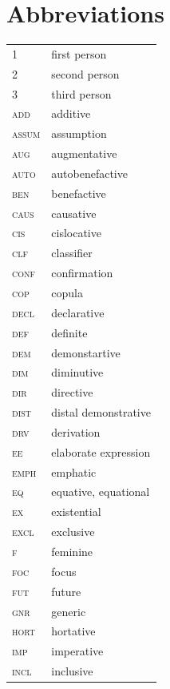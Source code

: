 \documentclass[output=paper,colorlinks,citecolor=brown]{langscibook}
\begin{document}
\section*{Abbreviations}
\begin{tabularx}{.45\textwidth}{lQ}
1 & first person \\
2 & second person \\
3 & third person \\
\scshape add & additive \\
\scshape assum & assumption \\
\scshape aug & augmentative \\
\scshape auto & autobenefactive \\
\scshape ben & benefactive \\
\scshape caus & causative \\
\scshape cis & cislocative \\
\scshape clf & classifier \\
\scshape conf & confirmation \\
\scshape cop & copula \\
\scshape decl & declarative \\
\scshape def & definite \\
\scshape dem & demonstartive \\
\scshape dim & diminutive \\
\scshape dir & directive \\
\scshape dist & distal demonstrative \\
\scshape drv & derivation \\
\scshape ee & elaborate expression \\
\scshape emph & emphatic \\
\scshape eq & equative, equational \\
\scshape ex & existential \\
\scshape excl & exclusive \\
\scshape f & feminine \\
\scshape foc & focus \\
\scshape fut & future \\
\scshape gnr & generic \\
\scshape hort & hortative \\
\scshape imp & imperative \\
\scshape incl & inclusive \\
\end{tabularx}
\end{document}
